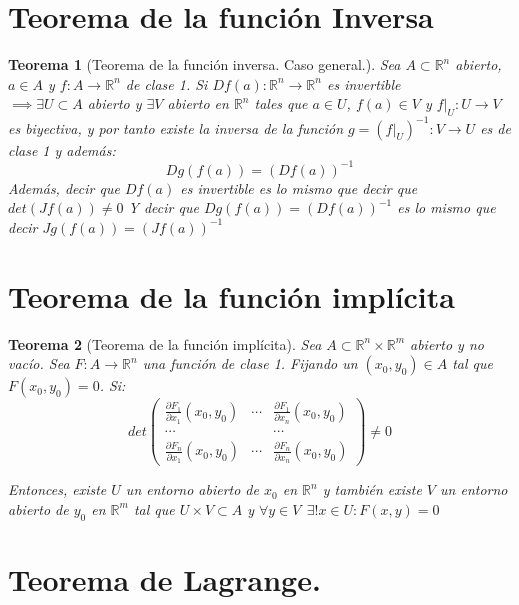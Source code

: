 \documentclass[11pt, a4paper]{article}
\newcommand{\R}{\mathbb{R}}
\theoremstyle{theorem-style}
\newtheorem*{nth}{Teorema}
\theoremstyle{definition-style}
\theoremstyle{remark-style}
\theoremstyle{example-style}
\begin{document}
\section{Teorema de la función Inversa}
\begin{nth}[Teorema de la función inversa. Caso general.]
	Sea $A \subset \R^n$ abierto, $a\in A$ y $f:A \to \R^n$ de clase 1. Si  
$Df(a): \R^n \to \R^n$ es invertible \\
$\implies \exists U\subset A$ abierto y $\exists V$ abierto en $\R^n$ tales que $a\in U $, $f(a) \in V$ y $f|_U : U \to V$ es biyectiva, y por tanto existe la inversa de la función $g = (f|_U)^{-1}: V \to U$ es de clase 1 y además:
	\[
	Dg(f(a)) = (Df(a))^{-1}
	\]
Además, decir que $Df(a)$ es invertible es lo mismo que decir que $det(Jf(a)) \ne 0$
Y decir que $Dg(f(a)) = (Df(a))^{-1}$ es lo mismo que decir $Jg(f(a)) = (Jf(a))^{-1}$
\end{nth}

\section{Teorema de la función implícita}
\begin{nth}[Teorema de la función implícita]
	Sea $A \subset \R^n \times\R^m$ abierto y no vacío. Sea $F: A \to \R^n$ una función de clase 1. Fijando un $(x_0,y_0) \in A$ tal que $F(x_0,y_0) = 0$. Si:
	\[
	det\begin{pmatrix}
 \frac{\partial F_1}{\partial x_1}(x_0,y_0) & \cdots & \frac{\partial F_1}{\partial x_n}(x_0,y_0) \\
 \cdots& & \cdots\\
 
 \frac{\partial F_n}{\partial x_1}(x_0,y_0) & \cdots & \frac{\partial F_n}{\partial x_n} (x_0,y_0)
\end{pmatrix} \ne 0
	\]
	
	Entonces, existe $U$ un entorno abierto de $x_0$ en $\R^n$ y también existe $V$ un entorno abierto de $y_0$ en $\R^m$ tal que $U\times V \subset A$ y $\forall y \in V \ \ \exists! x \in U : F(x,y) = 0$
\end{nth}


\section{Teorema de Lagrange.}
\end{document}
